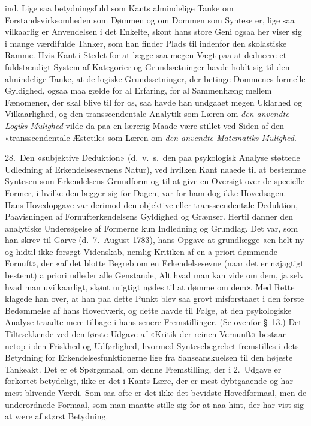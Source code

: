 \documentclass[12pt,a4paper]{article}
\newcommand{\apage}[1]{\marginnote{\footnotesize\textit{[#1]}}}
\begin{document}
ind. Lige saa betydningsfuld som Kants almindelige Tanke om
Forstandsvirksomheden som Dømmen og om Dommen som Syntese er, lige saa
vilkaarlig er Anvendelsen i det Enkelte, skønt hans store Geni ogsaa her
viser sig i mange værdifulde Tanker, som han finder Plads til indenfor den
skolastiske Ramme. Hvis Kant i Stedet for at lægge saa megen Vægt paa at
deducere et fuldstændigt System af Kategorier og Grundsætninger havde
holdt sig til den almindelige Tanke, at de logiske Grundsætninger, der
betinge Dommenes formelle Gyldighed, ogsaa maa gælde for al Erfaring, for
al Sammenhæng mellem Fænomener, der skal blive til for os, saa havde han
undgaaet megen Uklarhed og Vilkaarlighed, og den transscendentale
Analytik som Læren om \emph{den anvendte Logiks Mulighed} vilde da paa en
lærerig Maade være stillet ved Siden af den «transscendentale Æstetik»
som Læren om \emph{den anvendte Matematiks Mulighed}.

28.\ Den «subjektive Deduktion» (d.\ v.\ s.\ den paa psykologisk Analyse
støttede Udledning af Erkendelsesevnens Natur), ved hvilken Kant naaede
til at bestemme Syntesen som Erkendelsens Grundform og til at give en
Oversigt over de specielle Former, i hvilke den lægger sig for Dagen, var
for ham dog ikke Hovedsagen. Hans Hovedopgave var derimod den objektive
eller transscendentale Deduktion, Paavisningen af Fornufterkendelsens
Gyldighed og Grænser. Hertil danner den analytiske Undersøgelse af
Formerne kun Indledning og Grundlag. Det var, som han skrev til Garve (d.\
7.\ August 1783), hans Opgave at grundlægge «en helt ny og hidtil ikke
forsøgt Videnskab, nemlig Kritiken af en a priori dømmende Fornuft», der
«af det blotte Begreb om en Erkendelsesevne (naar det er nøjagtigt
bestemt) a priori udleder alle Genstande, Alt hvad man kan vide om dem,
ja selv hvad man uvilkaarligt, skønt urigtigt nødes til at dømme om dem».
Med Rette \apage{56} klagede han over, at han paa dette Punkt blev saa grovt
misforstaaet i den første Bedømmelse af hans Hovedværk, og dette havde til
Følge, at den psykologiske Analyse traadte mere tilbage i hans senere
Fremstillinger. (Se ovenfor §\ 13.) Det Tiltrækkende ved den første
Udgave af «Kritik der reinen Vernunft» bestaar netop i den Friskhed og
Udførlighed, hvormed Syntesebegrebet fremstilles i dets Betydning for
Erkendelsesfunktionerne lige fra Sanseanskuelsen til den højeste
Tankeakt. Det er et Spørgsmaal, om denne Fremstilling, der i 2.\ Udgave
er forkortet betydeligt, ikke er det i Kants Lære, der er mest dybtgaaende
og har mest blivende Værdi. Som saa ofte er det ikke det bevidste
Hovedformaal, men de underordnede Formaal, som man maatte stille sig for
at naa hint, der har vist sig at være af størst Betydning.
\end{document}
